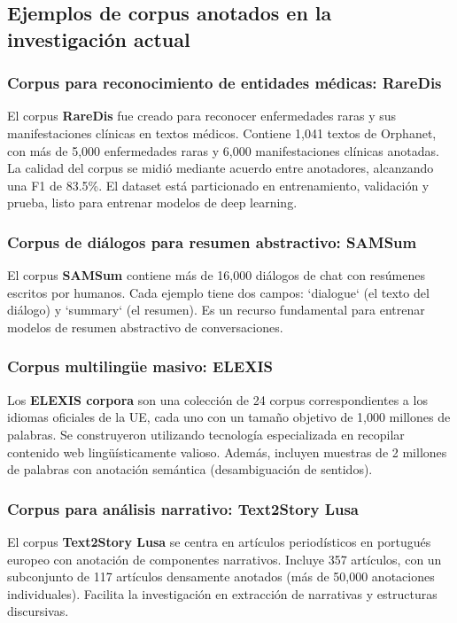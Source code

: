\documentclass[12pt,a4paper,openany,oneside]{book}
\begin{document}
\subsection{Ejemplos de corpus anotados en la investigación actual}

\subsubsection{Corpus para reconocimiento de entidades médicas: RareDis}
El corpus \textbf{RareDis} fue creado para reconocer enfermedades raras y sus manifestaciones clínicas en textos médicos. Contiene 1,041 textos de Orphanet, con más de 5,000 enfermedades raras y 6,000 manifestaciones clínicas anotadas. La calidad del corpus se midió mediante acuerdo entre anotadores, alcanzando una F1 de 83.5\%. El dataset está particionado en entrenamiento, validación y prueba, listo para entrenar modelos de deep learning.

\subsubsection{Corpus de diálogos para resumen abstractivo: SAMSum}
El corpus \textbf{SAMSum} contiene más de 16,000 diálogos de chat con resúmenes escritos por humanos. Cada ejemplo tiene dos campos: `dialogue` (el texto del diálogo) y `summary` (el resumen). Es un recurso fundamental para entrenar modelos de resumen abstractivo de conversaciones.

\subsubsection{Corpus multilingüe masivo: ELEXIS}
Los \textbf{ELEXIS corpora} son una colección de 24 corpus correspondientes a los idiomas oficiales de la UE, cada uno con un tamaño objetivo de 1,000 millones de palabras. Se construyeron utilizando tecnología especializada en recopilar contenido web lingüísticamente valioso. Además, incluyen muestras de 2 millones de palabras con anotación semántica (desambiguación de sentidos).

\subsubsection{Corpus para análisis narrativo: Text2Story Lusa}
El corpus \textbf{Text2Story Lusa} se centra en artículos periodísticos en portugués europeo con anotación de componentes narrativos. Incluye 357 artículos, con un subconjunto de 117 artículos densamente anotados (más de 50,000 anotaciones individuales). Facilita la investigación en extracción de narrativas y estructuras discursivas.
\end{document}
